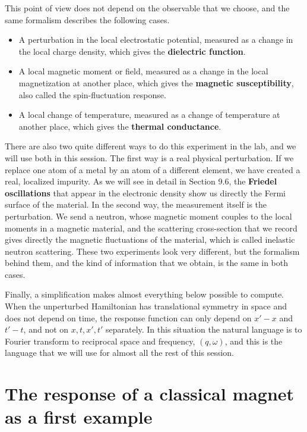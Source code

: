 This point of view does not depend on the observable that we choose, and the same formalism
describes the following cases.

\begin{itemize}
\item A perturbation in the local electrostatic potential, measured as a change in the local charge
  density, which gives the \textbf{dielectric function}.
\item A local magnetic moment or field, measured as a change in the local magnetization at another
  place, which gives the \textbf{magnetic susceptibility}, also called the spin-fluctuation response.
\item A local change of temperature, measured as a change of temperature at another place, which gives
  the \textbf{thermal conductance}.
\end{itemize}

There are also two quite different ways to do this experiment in the lab, and we will use both in
this session. The first way is a real
physical perturbation. If we replace one atom of a metal by an atom of a different element, we have
created a real, localized impurity. As we will see in detail in Section 9.6, the \textbf{Friedel
oscillations} that appear in the electronic density show us directly the Fermi surface of the
material. In the second way, the measurement itself is the perturbation. We send a neutron, whose
magnetic moment couples to the local moments in a magnetic material, and the scattering
cross-section that we record gives directly the magnetic fluctuations of the material, which is
called inelastic neutron scattering. These two experiments look very different, but the formalism
behind them, and the kind of information that we obtain, is the same in both cases.

Finally, a simplification makes almost everything below possible to compute. When the
unperturbed Hamiltonian has translational symmetry in space and does not depend on time, the response
function can only depend on $x'-x$ and $t'-t$, and not on $x,t,x',t'$ separately. In this situation
the natural language is to Fourier transform to reciprocal space and frequency, $(q,\omega)$, and
this is the language that we will use for almost all the rest of this session.

\section{The response of a classical magnet as a first example}


